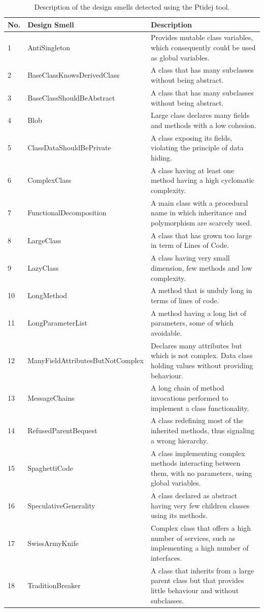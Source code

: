 \documentclass[AMA,Times1COL]{WileyNJDv5} %
\begin{document}
\begin{table}
	\centering %
	\caption{Description of the design smells detected using the Ptidej tool.} %
	\begin{tabular*}{\textwidth}{@{\extracolsep\fill}lll@{\extracolsep\fill}}%
			\toprule
			\textbf{No.} & \textbf{Design Smell} & \textbf{Description} \\ 
			\midrule
			1 & AntiSingleton & Provides mutable class variables, which consequently could be used as global variables. \\ 
			2 & BaseClassKnowsDerivedClass & A class that has many subclasses without being abstract.\\ 
		3 &BaseClassShouldBeAbstract &  A class that has many subclasses without being abstract. \\ 
			4 &Blob & Large class declares many fields and methods with a low cohesion. \\
		5 &ClassDataShouldBePrivate & A class exposing its fields, violating the principle of data hiding.\\ 
		6 &	ComplexClass & A class having at least one method having a high cyclomatic complexity. \\ 
		7 & FunctionalDecomposition & A main class with a procedural name in which inheritance and polymorphism are scarcely used.\\ 
		8 &	LargeClass  & A class that has grown too large in term of Lines of Code.\\ 
		9 &	LazyClass & A class having very small dimension, few methods and low complexity. \\ 
		10 &	LongMethod & A method that is unduly long in terms of lines of code.\\ 
		11 &	LongParameterList & A method having a long list of parameters, some of which avoidable.\\
		12 &	ManyFieldAttributesButNotComplex & Declares many attributes but which is not complex. Data class holding values without providing behaviour.\\
		13 &	MessageChains  & A long chain of method invocations performed to implement a class functionality. \\ 
		14 &	RefusedParentBequest & A class redefining most of the inherited methods, thus signaling a wrong hierarchy. \\ 
		15 &	SpaghettiCode  & A class implementing complex methods interacting between them, with no parameters, using global variables.\\ 
		16 &	SpeculativeGenerality & A class declared as abstract having very few children classes using its methods. \\ 
		17 &	SwissArmyKnife  & Complex class that offers a high number of services, such as implementing a high number of interfaces.\\
		18 &	TraditionBreaker & A class that inherits from a large parent class but that provides little behaviour and without subclasses.\\
			\bottomrule
		\end{tabular*}
		\label{table:ds_types} %
	\end{table}
\end{document}
